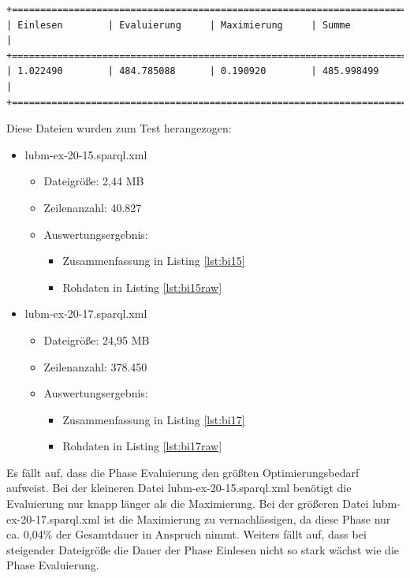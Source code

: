 \documentclass[draft,final]{vutinfth} %
\begin{document}
\begin{lstlisting}[basicstyle=\tiny,caption={Benchmark ITERATIVE, Datei: lubm-ex-20-17.sparql.xml},label={lst:bi17}]
+=======================================================================+
| Einlesen        | Evaluierung     | Maximierung     | Summe           | 
+=======================================================================+
| 1.022490        | 484.785088      | 0.190920        | 485.998499      |
+=======================================================================+
\end{lstlisting}

Diese Dateien wurden zum Test herangezogen:
\begin{itemize}
	\item lubm-ex-20-15.sparql.xml
	\begin{itemize}
		\item Dateigrö{\ss}e: 2,44 MB
		\item Zeilenanzahl: 40.827
		\item Auswertungsergebnis: 
		\begin{itemize}
			\item Zusammenfassung in Listing \ref{lst:bi15}
			\item Rohdaten in Listing \ref{lst:bi15raw}
		\end{itemize}
	\end{itemize}
	\item lubm-ex-20-17.sparql.xml
	\begin{itemize}
		\item Dateigrö{\ss}e: 24,95 MB
		\item Zeilenanzahl: 378.450
		\item Auswertungsergebnis: 
		\begin{itemize}
			\item Zusammenfassung in Listing \ref{lst:bi17}
			\item Rohdaten in Listing \ref{lst:bi17raw}
		\end{itemize}
	\end{itemize}
\end{itemize}

Es fällt auf, dass die Phase Evaluierung den grö\ss ten Optimierungsbedarf aufweist. Bei der kleineren Datei lubm-ex-20-15.sparql.xml benötigt die Evaluierung nur knapp länger als die Maximierung. Bei der grö\ss eren Datei lubm-ex-20-17.sparql.xml ist die Maximierung zu vernachlässigen, da diese Phase nur ca. 0,04\% der Gesamtdauer in Anspruch nimmt. Weiters fällt auf, dass bei steigender Dateigrö\ss e die Dauer der Phase Einlesen nicht so stark wächst wie die Phase Evaluierung.
\end{document}
